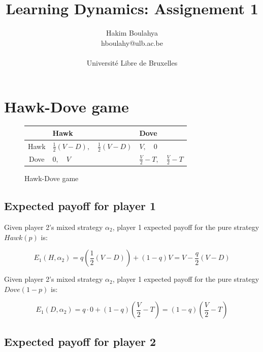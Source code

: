\documentclass[letterpaper]{article}
\title{Learning Dynamics: Assignement 1}
\author{\Large Hakim Boulahya \\
hboulahy@ulb.ac.be\\
\\
Université Libre de Bruxelles
}
\begin{document}
\maketitle
\tableofcontents

\section{Hawk-Dove game}


\begin{figure}[!ht]


\begin{center}
\begin{tabular}{|c|C|C|}
    \hline
     & Hawk & Dove \\[10pt]
    \hline
    Hawk & $\frac{1}{2}(V - D), \quad \frac{1}{2}(V - D)$ & $V, \quad 0$\\[10pt]
    \hline
    Dove & $0, \quad V$ & $\frac{V}{2} - T, \quad \frac{V}{2} - T$\\[10pt]
    \hline
\end{tabular}
\end{center}

\caption{Hawk-Dove game}
\label{fig:hawkdove}
\end{figure}

\subsection{Expected payoff for player 1}

Given player 2’s mixed strategy $\alpha_2$, player 1 expected payoff
for the pure strategy $Hawk(p)$ is:

\begin{equation}
    E_1(H, \alpha_2) = q (\frac{1}{2}(V - D)) + (1 - q)V
    = V - \frac{q}{2}(V - D)
\end{equation}

Given player 2’s mixed strategy $\alpha_2$, player 1 expected payoff
for the pure strategy $Dove(1 - p)$ is:

\begin{equation}
    E_1(D, \alpha_2) = q \cdot 0 + (1 - q)(\frac{V}{2} - T)
    = (1 - q)(\frac{V}{2} - T)
\end{equation}

\subsection{Expected payoff for player 2}
\end{document}
